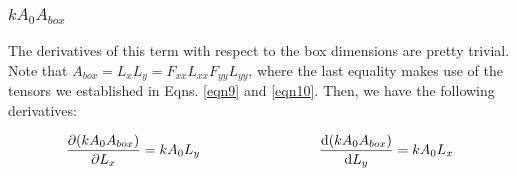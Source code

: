 \documentclass[12pt]{article}
\begin{document}
\subsubsection{$ k A_0 A_{box}$}

The derivatives of this term with respect to the box dimensions are pretty trivial. Note that $A_{box} = L_x L_y = F_{xx} L_{xx} F_{yy} L_{yy}$, where the last equality makes use of the tensors we established in Eqns. \ref{eqn9} and \ref{eqn10}. Then, we have the following derivatives:
\begin{center}
\begin{equation}
\pdv{ (k A_0 A_{box}) }{L_x} = k A_0 L_y \hspace{3cm} \dv{( k A_0 A_{box}) } {L_y} =  k A_0 L_x
\end{equation}
\end{center}
\end{document}

